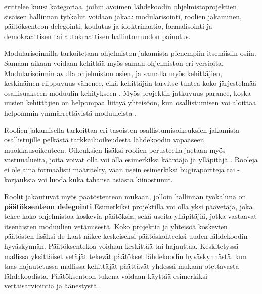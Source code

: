 \documentclass[utf8]{gradu3}
\begin{document}
\textcite{Laat-2007} erittelee kuusi kategoriaa, joihin avoimen lähdekoodin
ohjelmistoprojektien sisäisen hallinnan työkalut voidaan jakaa: modularisointi,
roolien jakaminen, päätöksenteon delegointi, koulutus ja idoktrinaatio,
formalisointi ja demokraattisen tai autokraattisen hallintomuodon painotus.

Modularisoinnilla tarkoitetaan ohjelmiston jakamista pienempiin itsenäisiin
osiin. Samaan aikaan voidaan kehittää myös saman ohjelmiston eri versioita.
Modularisoinnin avulla ohjelmiston osien, ja samalla myös kehittäjien,
keskinäinen riippuvuus vähenee, eikä kehittäjän tarvitse tuntea koko
järjestelmää osallisuakseen moduulin kehitykseen \parencite{Lee-2001}. Myös
projektin jatkuvuus paranee, koska uusien kehittäjien on helpompaa liittyä
yhteisöön, kun osallistumisen voi aloittaa helpommin ymmärrettävistä moduuleista
\parencite{Aberdour-2007,Lee-2001}.

Roolien jakamisella \textcite{Laat-2007} tarkoittaa eri tasoisten
osallistumisoikeuksien jakamista osallistujille pelkästä tarkkailuoikeudesta
lähdekoodin vapaaseen muokkausoikeuteen. Oikeuksien lisäksi roolien perusteella
jaetaan myös vastuualueita, joita voivat olla voi olla esimerkiksi kääntäjä ja
ylläpitäjä \parencite{Laat-2007}. Rooleja ei ole aina formaalisti määritelty,
vaan usein esimerkiksi bugiraportteja tai -korjauksia voi luoda kuka tahansa
asiasta kiinostunut.

Roolit jakautuvat myös päätöstenteon mukaan, jolloin hallinnan työkaluna on
\textbf{päätöksenteon delegointi} Esimerkiksi projektilla voi olla yksi
päävetäjä, joka tekee koko ohjelmistoa koskevia päätöksia, sekä useita
ylläpitäjiä, jotka vastaavat itsenäisten moduulien vetämisestä. Koko projektia
ja yhteisöä koskevien päätösten lisäksi de Laat näkee keskeiseksi
päätöskohteeksi uuden lähdekoodin hyväskynnän. Päätöksentekoa voidaan keskittää
tai hajauttaa. Keskitetyssä mallissa yksittäiset vetäjät tekevät päätökset
lähdekoodin hyväskynnästä, kun taas hajautetussa mallissa kehittäjät päättävät
yhdessä mukaan otettavasta lähdekoodista. Päätöksenteon tukena voidaan käyttää
esimerkiksi vertaisarviointia ja äänestystä.%
\end{document}
